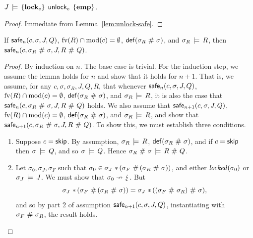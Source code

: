 \documentclass[11pt]{report}
\begin{document}
\begin{lemma}
    \label{lem:unlock-sound}
    $J\,\models\,\left\lbrace \mathbf{lock}_{e} \right\rbrace\;\operatorname{\mathsf{unlock}}_{e}\;\left\lbrace \mathbf{emp} \right\rbrace$. 
\end{lemma} 

\begin{proof}
    Immediate from Lemma~\ref{lem:unlock-safe}. 
\end{proof}

\begin{lemma}
	\label{lem:weak-interleaving-safe}
	If $\mathsf{safe}_{n}(c,\sigma,J,Q)$, $\mathrm{fv}(R) \cap \mathrm{mod}(c) = \operatorname{\emptyset}$, $\mathsf{def}(\sigma_R \operatorname{\,\#\,} \sigma)$, and $\sigma_R \,\models\, R$, then $\mathsf{safe}_{n}(c, \sigma_R \operatorname{\,\#\,} \sigma,J,R \operatorname{\,\#\,} Q)$. 
\end{lemma}

\begin{proof}
	By induction on $n$. The base case is trivial. For the induction step, we assume the lemma holds for $n$ and show that it holds for $n+1$. That is, we assume, for any $c,\sigma,\sigma_R,J,Q,R$, that whenever $\mathsf{safe}_{n}(c,\sigma,J,Q)$, $\mathrm{fv}(R) \cap \mathrm{mod}(c) = \operatorname{\emptyset}$, $\mathsf{def}(\sigma_R \operatorname{\,\#\,} \sigma)$, and $\sigma_R \,\models\, R$, it is also the case that $\mathsf{safe}_{n}(c,\sigma_R \operatorname{\,\#\,} \sigma,J,R \operatorname{\,\#\,} Q)$ holds. We also assume that $\mathsf{safe}_{n+1}(c,\sigma,J,Q)$, $\mathrm{fv}(R) \cap \mathrm{mod}(c) = \operatorname{\emptyset}$, $\mathsf{def}(\sigma_R \operatorname{\,\#\,} \sigma)$, and $\sigma_R \,\models\, R$, and show that \\ 
	$\mathsf{safe}_{n+1}(c,\sigma_R \operatorname{\,\#\,} \sigma,J,R \operatorname{\,\#\,} Q)$. To show this, we must establish three conditions. 

	\begin{enumerate}
		\item Suppose $c = \operatorname{\mathsf{skip}}$. By assumption, $\sigma_R \,\models\, R$, $\mathsf{def}(\sigma_R \operatorname{\,\#\,} \sigma)$, and if $c = \operatorname{\mathsf{skip}}$ then $\sigma \,\models\, Q$, and so $\sigma \,\models\, Q$. Hence $\sigma_R \operatorname{\,\#\,} \sigma \,\models\, R \operatorname{\,\#\,} Q$. 

		\item Let $\sigma_0,\sigma_J,\sigma_F$ such that $\sigma_0 \in \sigma_J \operatorname{\,\ast\,} (\sigma_F \operatorname{\,\#\,} (\sigma_R \operatorname{\,\#\,} \sigma))$, and either $\mathit{locked}(\sigma_0)$ or $\sigma_J \,\models\, J$. We must show that $\sigma_0 \nrightarrow \lightning$. But \[ \sigma_J \operatorname{\,\ast\,} (\sigma_F \operatorname{\,\#\,} (\sigma_R \operatorname{\,\#\,} \sigma)) = \sigma_J \operatorname{\,\ast\,} ((\sigma_F \operatorname{\,\#\,} \sigma_R) \operatorname{\,\#\,} \sigma),\] and so by part 2 of assumption $\mathsf{safe}_{n+1}(c,\sigma,J,Q)$, instantiating with $\sigma_F \operatorname{\,\#\,} \sigma_R$, the result holds. 


\end{enumerate}
\end{proof}
\end{document}
